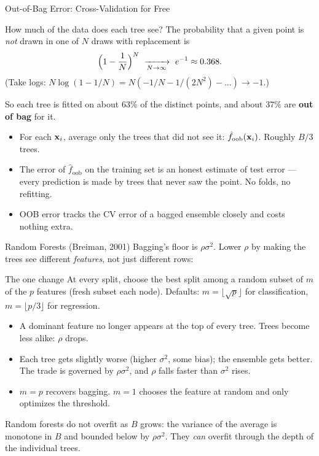 \documentclass[11pt,aspectratio=169]{beamer}
\begin{document}
\begin{frame}{Out-of-Bag Error: Cross-Validation for Free}
\begin{derivation}{How much of the data does each tree see?}
The probability that a given point is \emph{not} drawn in one of $N$ draws with replacement is
\[
\Bigl(1-\frac1N\Bigr)^N\ \xrightarrow[N\to\infty]{}\ e^{-1}\approx0.368 .
\]
(Take logs: $N\log(1-1/N)=N(-1/N-1/(2N^2)-\dots)\to-1$.)
\end{derivation}
So each tree is fitted on about $63\%$ of the distinct points, and about $37\%$ are \textbf{out of bag} for it.
\begin{itemize}
  \item For each $\mathbf{x}_i$, average only the trees that did not see it: $\hat f_{\text{oob}}(\mathbf{x}_i)$. Roughly $B/3$ trees.
  \item The error of $\hat f_{\text{oob}}$ on the training set is an honest estimate of test error --- every prediction
        is made by trees that never saw the point. No folds, no refitting.
  \item OOB error tracks the CV error of a bagged ensemble closely and costs nothing extra.
\end{itemize}
\end{frame}

\begin{frame}{Random Forests (Breiman, 2001)}
Bagging's floor is $\rho\sigma^2$. Lower $\rho$ by making the trees see different \emph{features}, not just
different rows:
\begin{block}{The one change}
At every split, choose the best split among a random subset of $m$ of the $p$ features (fresh subset each node).
Defaults: $m=\lfloor\sqrt p\rfloor$ for classification, $m=\lfloor p/3\rfloor$ for regression.
\end{block}
\begin{itemize}
  \item A dominant feature no longer appears at the top of every tree. Trees become less alike: $\rho$ drops.
  \item Each tree gets slightly worse (higher $\sigma^2$, some bias); the ensemble gets better. The trade is
        governed by $\rho\sigma^2$, and $\rho$ falls faster than $\sigma^2$ rises.
  \item $m=p$ recovers bagging. $m=1$ chooses the feature at random and only optimizes the threshold.
\end{itemize}
\begin{keypoint}
Random forests do not overfit as $B$ grows: the variance of the average is monotone in $B$ and bounded below
by $\rho\sigma^2$. They \emph{can} overfit through the depth of the individual trees.
\end{keypoint}
\end{frame}
\end{document}
